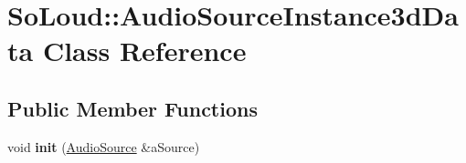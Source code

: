 \hypertarget{class_so_loud_1_1_audio_source_instance3d_data}{}\section{So\+Loud\+::Audio\+Source\+Instance3d\+Data Class Reference}
\label{class_so_loud_1_1_audio_source_instance3d_data}
\subsection*{Public Member Functions}
\begin{DoxyCompactItemize}
\item 
\mbox{\label{class_so_loud_1_1_audio_source_instance3d_data_a358f5377c312eb39cf17561a8de71b75}} 
void {\bfseries init} (\mbox{\hyperlink{class_so_loud_1_1_audio_source}{Audio\+Source}} \&a\+Source)
\end{DoxyCompactItemize}
